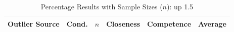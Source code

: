 \begin{table}[ht]
    \centering
    \caption{Percentage Results with Sample Sizes ($n$): up 1.5}
    \begin{tabular}{l l c c c c}
        \toprule
        \textbf{Outlier Source} & \textbf{Cond.} & \textbf{$n$} & \textbf{Closeness} & \textbf{Competence} & \textbf{Average} \\
        \midrule
        \bottomrule
    \end{tabular}
\end{table}